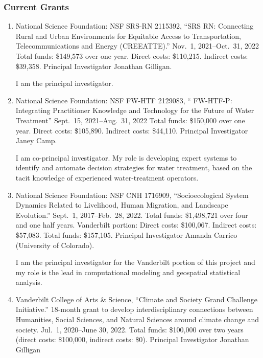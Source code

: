 %
%
\subsubsection{Current Grants}
\begin{enumerate}
%
\item National Science Foundation: NSF SRS-RN 2115392,
``SRS RN: Connecting Rural and Urban Environments for Equitable Access to
Transportation, Telecommunications and Energy (CREEATTE).''
Nov.~1, 2021--Oct.~31, 2022
Total funds: \$149,573 over one year. Direct costs: \$110,215. Indirect costs: \$39,358.
Principal Investigator Jonathan Gilligan.
\begin{credit}
  I am the principal investigator.
\end{credit}
%
\item National Science Foundation: NSF FW-HTF 2129083,
`` FW-HTF-P: Integrating Practitioner Knowledge and Technology for the Future of Water Treatment''
Sept.~15, 2021--Aug.~31, 2022
Total funds: \$150,000 over one year. Direct costs: \$105,890. Indirect costs: \$44,110.
Principal Investigator Janey Camp.
\begin{credit}
I am co-principal investigator. My role is developing expert systems to
identify and automate decision strategies for water treatment, based on the
tacit knowledge of experienced water-treatment operators.
\end{credit}
%
%
\item National Science Foundation: NSF CNH 1716909,
``Socioecological System Dynamics Related to Livelihood, Human Migration, and Landscape Evolution.''
Sept.~1, 2017--Feb.~28, 2022.
Total funds: \$1,498,721 over four and one half years. Vanderbilt portion: Direct costs: \$100,067. Indirect costs: \$57,083. Total funds: \$157,105.
Principal Investigator Amanda Carrico (University of Colorado).
\begin{credit}
I am the principal investigator for the Vanderbilt portion of this project and my role is the lead in computational modeling and geospatial statistical analysis.
\end{credit}
%
\item Vanderbilt College of Arts \& Science,
``Climate and Society Grand Challenge Initiative.''
18-month grant to develop interdisciplinary connections between Humanities, Social Sciences, and Natural Sciences around climate change and society.
Jul.~1, 2020--June 30, 2022.
Total funds: \$100,000 over two years (direct costs: \$100,000,
indirect costs: \$0).
Principal Investigator Jonathan Gilligan

\end{enumerate}
